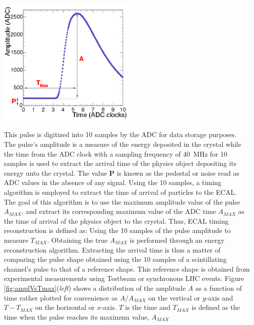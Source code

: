 \begin{center}
\centering
\mbox{\includegraphics[height=0.5\textwidth, width=0.5\textwidth]{THESISPLOTS/Time_Amplitude_Profile.png}}
\label{fig:pulse}
\end{center}

This pulse is digitized into 10 samples by the ADC for data storage purposes. The pulse's amplitude  is a measure of the energy deposited in the crystal while the time from the ADC clock with a sampling frequency of 40~MHz for 10 samples is used to extract the arrival time of the physics object depositing its energy unto the crystal. The value \textbf{P} is known as the pedestal or noise read as ADC values in the absence of any signal. Using the 10 samples, a timing algorithm is employed to extract the time of arrival of particles to the ECAL. The goal of this algorithm is to use the maximum amplitude value of the pulse $A_{MAX}$, and extract its corresponding maximum value of the ADC time $A_{MAX}$ as the time of arrival of the physics object to the crystal. Thus, ECAL timing reconstruction is defined as: Using the 10 samples of the pulse amplitude to measure $T_{MAX}$. Obtaining the true $A_{MAX}$ is performed through an energy reconstruction algorithm. Extracting the arrival time is thus a matter of comparing the pulse shape obtained using the 10 samples of a scintillating channel's pulse to that of a reference shape.
This reference shape is obtained from experimental measurements using Testbeam or synchronous LHC events. Figure \ref{fig:amplVsTmax}(\textit{left}) shows a distribution of the amplitude $A$ as a function of time rather plotted for convenience as $A/A_{MAX}$ on the vertical or $y$-axis and $T - T_{MAX}$ on the horizontal or $x$-axis. $T$ is the time and $T_{MAX}$ is defined as the time when the  pulse reaches its maximum value, $A_{MAX}$ 

